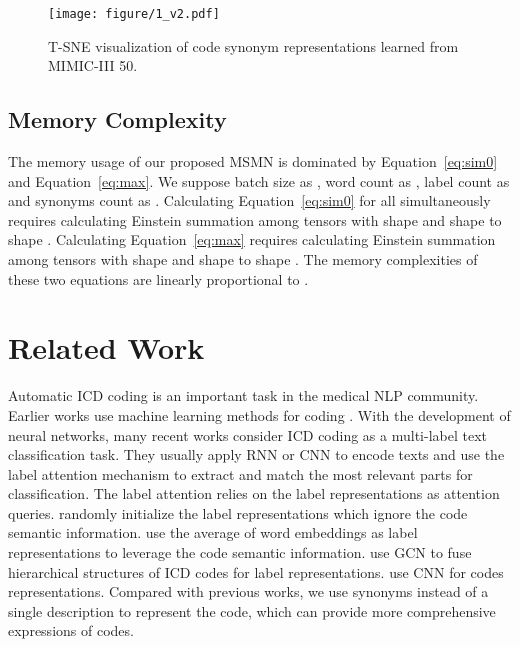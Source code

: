 \documentclass[11pt]{article}
\begin{document}
\begin{figure}[t]
\centering
\texttt{[image: figure/1\_v2.pdf]}
\caption{T-SNE visualization of code synonym representations learned from MIMIC-III 50.}
\label{fig:example}
\end{figure}

\subsection{Memory Complexity}
The memory usage of our proposed MSMN is dominated by Equation~\ref{eq:sim0} and Equation~\ref{eq:max}.
We suppose batch size as , word count as , label count as  and synonyms count as .
Calculating Equation~\ref{eq:sim0} for all  simultaneously requires calculating Einstein summation \cite{daniel2018opt} among tensors with shape  and shape  to shape .
Calculating Equation~\ref{eq:max} requires calculating Einstein summation among tensors with shape  and shape  to shape . The memory complexities of these two equations are linearly proportional to .

\section{Related Work}
Automatic ICD coding is an important task in the medical NLP community.
Earlier works use machine learning methods for coding \cite{larkey1996combining,pestian-etal-2007-shared,perotte2014diagnosis}.
With the development of neural networks, many recent works consider ICD coding as a multi-label text classification task. They usually apply RNN or CNN to encode texts and use the label attention mechanism to extract and match the most relevant parts for classification.
The label attention relies on the label representations as attention queries.
\citet{li2020icd,ijcai2020-461-vu} randomly initialize the label representations which ignore the code semantic information.
\citet{cao2020hypercore} use the average of word embeddings as label representations to leverage the code semantic information.
\citet{xie2019ehr,cao2020hypercore} use GCN to fuse hierarchical structures of ICD codes for label representations.
\citet{kim2021read} use CNN for codes representations.
Compared with previous works, 
we use synonyms instead of a single description to represent the code, which can provide more comprehensive expressions of codes.
\end{document}
